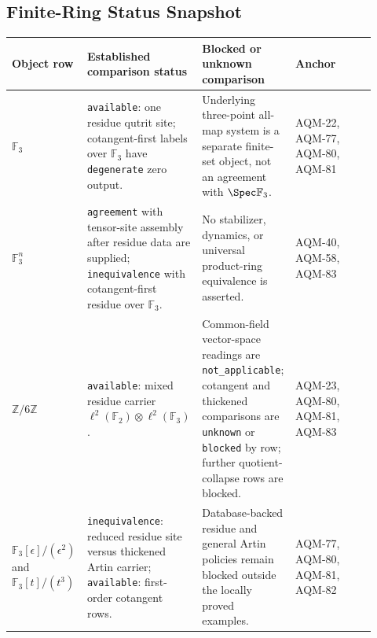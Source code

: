 \subsection{Finite-Ring Status Snapshot}

\begin{center}
\scriptsize\setlength{\tabcolsep}{3pt}
\begin{tabular}{p{0.19\linewidth}p{0.26\linewidth}p{0.25\linewidth}p{0.22\linewidth}}
\toprule
Object row & Established comparison status & Blocked or unknown comparison & Anchor \\
\midrule
\(\mathbb F_3\) &
\texttt{available}: one residue qutrit site; cotangent-first labels over
\(\mathbb F_3\) have \texttt{degenerate} zero output. &
Underlying three-point all-map system is a separate finite-set object, not an
agreement with \(\Spec\mathbb F_3\). &
AQM-22, AQM-77, AQM-80, AQM-81 \\
\addlinespace
\(\mathbb F_3^n\) &
\texttt{agreement} with tensor-site assembly after residue data are supplied;
\texttt{inequivalence} with cotangent-first residue over \(\mathbb F_3\). &
No stabilizer, dynamics, or universal product-ring equivalence is asserted. &
AQM-40, AQM-58, AQM-83 \\
\addlinespace
\(\mathbb Z/6\mathbb Z\) &
\texttt{available}: mixed residue carrier
\(\ell^2(\mathbb F_2)\otimes\ell^2(\mathbb F_3)\). &
Common-field vector-space readings are \texttt{not\_applicable}; cotangent and thickened comparisons are \texttt{unknown} or \texttt{blocked} by row; further quotient-collapse rows are blocked. &
AQM-23, AQM-80, AQM-81, AQM-83 \\
\addlinespace
\(\mathbb F_3[\epsilon]/(\epsilon^2)\) and
\(\mathbb F_3[t]/(t^3)\) &
\texttt{inequivalence}: reduced residue site versus thickened Artin carrier;
\texttt{available}: first-order cotangent rows. &
Database-backed residue and general Artin policies remain blocked outside the
locally proved examples. &
AQM-77, AQM-80, AQM-81, AQM-82 \\
\bottomrule
\end{tabular}
\end{center}

